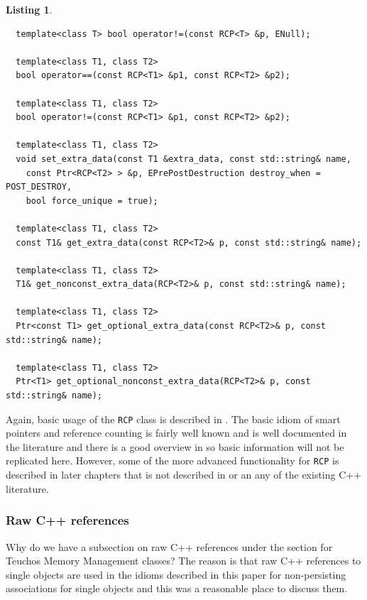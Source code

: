 \documentclass[pdf,ps2pdf,11pt]{SANDreport}
\newtheorem{listing}{Listing}
\begin{document}
\begin{listing}
{\begin{verbatim}
  template<class T> bool operator!=(const RCP<T> &p, ENull);
  
  template<class T1, class T2>
  bool operator==(const RCP<T1> &p1, const RCP<T2> &p2);
  
  template<class T1, class T2>
  bool operator!=(const RCP<T1> &p1, const RCP<T2> &p2);
  
  template<class T1, class T2>
  void set_extra_data(const T1 &extra_data, const std::string& name,
    const Ptr<RCP<T2> > &p, EPrePostDestruction destroy_when = POST_DESTROY,
    bool force_unique = true);
  
  template<class T1, class T2> 
  const T1& get_extra_data(const RCP<T2>& p, const std::string& name);
  
  template<class T1, class T2>
  T1& get_nonconst_extra_data(RCP<T2>& p, const std::string& name);
  
  template<class T1, class T2>
  Ptr<const T1> get_optional_extra_data(const RCP<T2>& p, const std::string& name);
  
  template<class T1, class T2>
  Ptr<T1> get_optional_nonconst_extra_data(RCP<T2>& p, const std::string& name);

\end{verbatim}}
\end{listing}

Again, basic usage of the {}\texttt{RCP} class is described in
{}\cite{RefCountPtrBeginnersGuide}.  The basic idiom of smart pointers and
reference counting is fairly well known and is well documented in the
literature and there is a good overview in {}\cite{RefCountPtrBeginnersGuide}
so basic information will not be replicated here.  However, some of the more
advanced functionality for {}\texttt{RCP} is described in later chapters that
is not described in {}\cite{RefCountPtrBeginnersGuide} or an any of the
existing C++ literature.


%
{}\subsubsection{Raw C++ references}
\label{sec:raw-C++-references}
%

Why do we have a subsection on raw C++ references under the section
for Teuchos Memory Management classes?  The reason is that raw C++
references to single objects are used in the idioms described in this
paper for non-persisting associations for single objects and this was
a reasonable place to discuss them.
\end{document}
